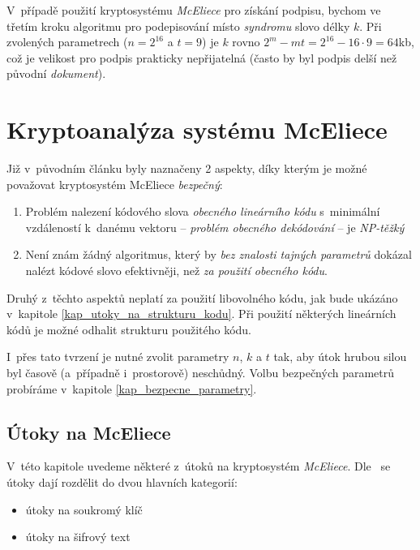 \documentclass[thesis=M,czech,hidelinks]{FITthesis}[2012/06/26]
\newcommand{\0}{{\textcolor[gray]{0.75}{0}}}
\begin{document}
V~případě použití kryptosystému \emph{McEliece} pro získání podpisu, bychom ve
třetím kroku algoritmu pro podepisování místo \emph{syndromu} slovo délky $k$.
Při zvolených parametrech ($n=2^{16}$ a $t=9$) je $k$ rovno $2^m - m t = 2^{16}
- 16 \cdot 9 = 64$\;kb, což je velikost pro podpis prakticky nepřijatelná (často
by byl podpis delší než původní \emph{dokument}).

\clearpage


\section{Kryptoanalýza systému McEliece}\label{kap_kryptoanalyza}

Již v~původním článku \cite{McEliece} byly naznačeny 2 aspekty, díky kterým je
možné považovat kryptosystém McEliece \emph{bezpečný}:


\begin{enumerate}
    \item Problém nalezení kódového slova \emph{obecného lineárního kódu}
        s~minimální vzdáleností k~danému vektoru
        -- \emph{problém obecného dekódování} -- je \emph{NP-těžký}
        \cite{Berlekamp1}
    \item Není znám žádný algoritmus, který by \emph{bez znalosti tajných parametrů}
        dokázal nalézt kódové slovo efektivněji, než \emph{za použití obecného kódu}.
\end{enumerate}


Druhý z~těchto aspektů neplatí za použití libovolného kódu, jak bude ukázáno
v~kapitole \ref{kap_utoky_na_strukturu_kodu}. Při použití některých lineárních
kódů je možné odhalit strukturu použitého kódu.

I~přes tato tvrzení je nutné zvolit parametry $n$, $k$ a $t$ tak, aby útok
hrubou silou byl časově (a~případně i~prostorově) neschůdný. Volbu bezpečných
parametrů probíráme v~kapitole \ref{kap_bezpecne_parametry}.


\subsection{Útoky na McEliece}

V~této kapitole uvedeme některé z~útoků na kryptosystém \emph{McEliece}.
Dle~\cite{Engelbert} se útoky dají rozdělit do dvou hlavních kategorií:

\begin{itemize}
    \item útoky na soukromý klíč
    \item útoky na šifrový text
\end{itemize}
\end{document}
